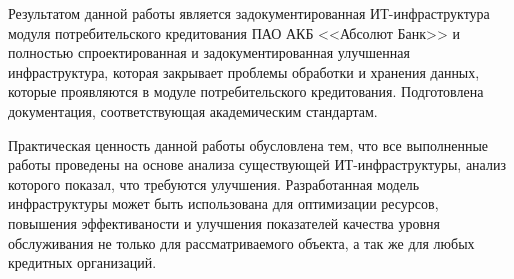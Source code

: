 \documentclass[14pt, a4paper]{extarticle}
\begin{document}
Результатом данной работы является задокументированная ИТ-инфраструктура модуля
потребительского кредитования ПАО АКБ <<Абсолют Банк>> и полностью
спроектированная и задокументированная улучшенная инфраструктура, которая
закрывает проблемы обработки и хранения данных, которые проявляются в модуле
потребительского кредитования. Подготовлена документация, соответствующая
академическим стандартам.

Практическая ценность данной работы обусловлена тем, что все выполненные работы
проведены на основе анализа существующей ИТ-инфраструктуры, анализ которого
показал, что требуются улучшения. Разработанная модель инфраструктуры может
быть использована для оптимизации ресурсов, повышения эффективаности и
улучшения показателей качества уровня обслуживания не только для
рассматриваемого объекта, а так же для любых кредитных организаций.


\begingroup
	\let\itshape\upshape
	\sloppy
	\raggedright
	\printbibliography[title=СПИСОК ИСПОЛЬЗУЕМЫХ ИСТОЧНИКОВ]
\endgroup
\end{document}
